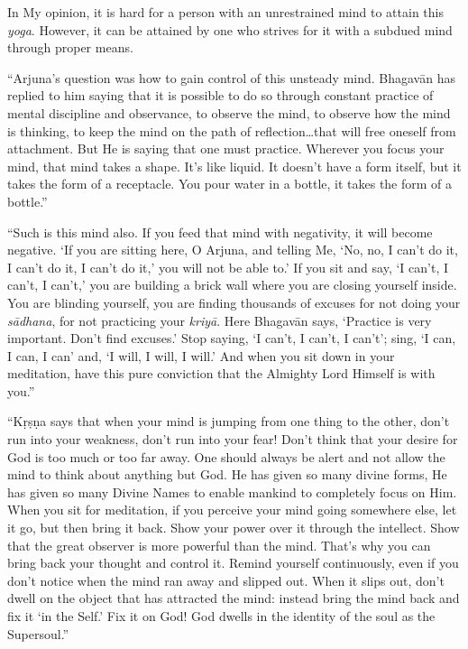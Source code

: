 {In My opinion, it is hard for a person with an unrestrained mind to attain this \textit{yoga}. However, it can be attained by one who strives for it with a subdued mind through proper means.}

\enquote{Arjuna’s question was how to gain control of this unsteady mind. Bhagavān has replied to him saying that it is possible to do so through constant practice of mental discipline and observance, to observe the mind, to observe how the mind is thinking, to keep the mind on the path of reflection\ldots that will free oneself from attachment. But He is saying that one must practice. Wherever you focus your mind, that mind takes a shape. It’s like liquid. It doesn’t have a form itself, but it takes the form of a receptacle. You pour water in a bottle, it takes the form of a bottle.}

\enquote{Such is this mind also. If you feed that mind with negativity, it will become negative. \enquote{If you are sitting here, O Arjuna, and telling Me, ‘No, no, I can’t do it, I can’t do it, I can’t do it,’ you will not be able to.} If you sit and say, \enquote{I can’t, I can’t, I can’t,} you are building a brick wall where you are closing yourself inside. You are blinding yourself, you are finding thousands of excuses for not doing your \textit{sādhana}, for not practicing your \textit{kriyā}. Here Bhagavān says, \enquote{Practice is very important. Don’t find excuses.} Stop saying, \enquote{I can’t, I can’t, I can’t}; sing, \enquote{I can, I can, I can} and, \enquote{I will, I will, I will.} And when you sit down in your meditation, have this pure conviction that the Almighty Lord Himself is with you.}

\enquote{Kṛṣṇa says that when your mind is jumping from one thing to the other, don’t run into your weakness, don’t run into your fear! Don’t think that your desire for God is too much or too far away. One should always be alert and not allow the mind to think about anything but God. He has given so many divine forms, He has given so many Divine Names to enable mankind to completely focus on Him. When you sit for meditation, if you perceive your mind going somewhere else, let it go, but then bring it back. Show your power over it through the intellect. Show that the great observer is more powerful than the mind. That’s why you can bring back your thought and control it. Remind yourself continuously, even if you don’t notice when the mind ran away and slipped out. When it slips out, don’t dwell on the object that has attracted the mind: instead bring the mind back and fix it \enquote{in the Self.} Fix it on God! God dwells in the identity of the soul as the Supersoul.}

